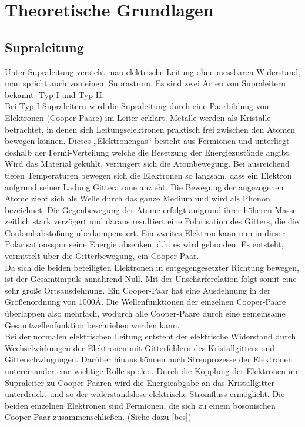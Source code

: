 \documentclass[12pt]{article}
\begin{document}
\section{Theoretische Grundlagen}
\subsection{Supraleitung}
Unter Supraleitung versteht man elektrische Leitung ohne messbaren Widerstand, man spricht auch von einem Suprastrom.
Es sind zwei Arten von Supraleitern bekannt: Typ-I und Typ-II. \\

Bei Typ-I-Supraleitern wird die Supraleitung durch eine Paarbildung von Elektronen (Cooper-Paare) im Leiter erklärt.
Metalle werden als Kristalle betrachtet, in denen sich Leitungselektronen praktisch frei zwischen den Atomen bewegen können. Dieses „Elektronengas“ besteht aus Fermionen und unterliegt deshalb der Fermi-Verteilung welche die Besetzung der Energiezustände angibt. Wird das Material gekühlt, verringert sich die Atombewegung. Bei ausreichend tiefen Temperaturen bewegen sich die Elektronen so langsam, dass ein Elektron aufgrund seiner Ladung Gitteratome anzieht. Die Bewegung der angezogenen Atome zieht sich als Welle durch das ganze Medium und wird als Phonon bezeichnet. Die Gegenbewegung der Atome erfolgt aufgrund ihrer höheren Masse zeitlich stark verzögert und daraus resultiert eine Polarisation des Gitters, die die Coulombabstoßung überkompensiert. Ein zweites Elektron kann nun in dieser Polarisationsspur seine Energie absenken, d.h. es wird gebunden. Es entsteht, vermittelt über die Gitterbewegung, ein Cooper-Paar.\\

Da sich die beiden beteiligten Elektronen in entgegengesetzter Richtung bewegen, ist der Gesamtimpuls annährend Null.
Mit der Unschärferelation folgt somit eine sehr große Ortsausdehnung. Ein Cooper-Paar hat eine Ausdehnung in der Größenordnung von 1000\AA. Die Wellenfunktionen der einzelnen Cooper-Paare überlappen also mehrfach, wodurch alle Cooper-Paare durch eine gemeinsame Gesamtwellenfunktion beschrieben werden kann.\\

Bei der normalen elektrischen Leitung entsteht der elektrische Widerstand durch Wechselwirkungen der Elektronen mit Gitterfehlern des Kristallgitters und Gitterschwingungen. Darüber hinaus können auch Streuprozesse der Elektronen untereinander eine wichtige Rolle spielen. Durch die Kopplung der Elektronen im Supraleiter zu Cooper-Paaren wird die Energieabgabe an das Kristallgitter unterdrückt und so der widerstandslose elektrische Stromfluss ermöglicht. Die beiden einzelnen Elektronen sind Fermionen, die sich zu einem bosonischen Cooper-Paar zusammenschließen. (Siehe dazu \ref{bcs})\\
\end{document}
